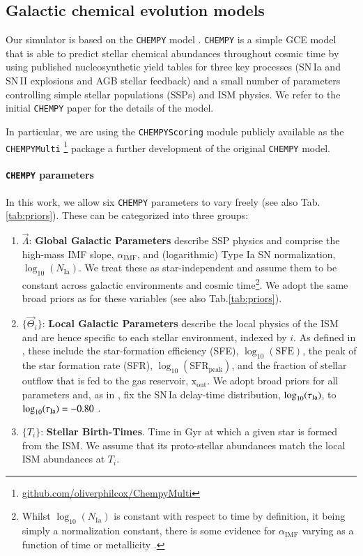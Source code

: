 \documentclass{aa}
\begin{document}
\subsection{Galactic chemical evolution models}
Our simulator is based on the \texttt{CHEMPY} model \citep{Rybizki_2017}. \texttt{CHEMPY} is a simple GCE model that is able to predict stellar chemical abundances throughout cosmic time by using published nucleosynthetic yield tables for three key processes (SN\,Ia and SN\,II explosions and AGB stellar feedback) and a small number of parameters controlling simple stellar populations (SSPs) and ISM physics. We refer to the initial \texttt{CHEMPY} paper \citep{Rybizki_2017} for the details of the model.

In particular, we are using the \texttt{CHEMPYScoring} module \citep{Philcox_2018} publicly available as the \texttt{CHEMPYMulti} \citep{Philcox_2019}\footnote{\href{https://github.com/oliverphilcox/ChempyMulti}{github.com/oliverphilcox/ChempyMulti}} package a further development of the original \texttt{CHEMPY} model. 

\paragraph{\texttt{CHEMPY} parameters}
In this work, we allow six \texttt{CHEMPY} parameters to vary freely (see also Tab.\,\ref{tab:priors}). These can be categorized into three groups:
\begin{enumerate}
     \item $\vec\Lambda$: \textbf{Global Galactic Parameters} describe SSP physics and comprise the high-mass \citet{2003PASP..115..763C} IMF slope, $\alpha_\mathrm{IMF}$, and (logarithmic) Type Ia SN normalization, $\log_{10}(N_\mathrm{Ia})$. We treat these as star-independent and assume them to be constant across galactic environments and cosmic time\footnote{Whilst $\log_{10}(N_\mathrm{Ia})$ is constant with respect to time by definition, it being simply a normalization constant, there is some evidence for $\alpha_\mathrm{IMF}$ varying as a function of time or metallicity \citep{Chabrier2014,2016MNRAS.462.2832C,2019MNRAS.482..118G,Martin2019}.}. 
     We adopt the same broad priors as \citep{Philcox_2019} for these variables (see also Tab.\ref{tab:priors}). 
     \item $\{\vec\Theta_i\}$: \textbf{Local Galactic Parameters} describe the local physics of the ISM and are hence specific to each stellar environment, indexed by $i$. As defined in \citep{Rybizki_2017}, these include the star-formation efficiency (SFE), $\log_{10}(\text{SFE})$, the peak of the star formation rate (SFR), $\log_{10}(\mathrm{SFR}_\mathrm{peak})$, and the fraction of stellar outflow that is fed to the gas reservoir, $\mathrm{x}_\mathrm{out}$. We adopt broad priors for all parameters and, as in \citep{Philcox_2019}, fix the SN\,Ia delay-time distribution, $\log_{10}(\tau_{\rm Ia})$, to $\log_{10}(\tau_{\rm Ia})=-0.80$ \citep[see also][]{Philcox_2018}.
     \item $\{T_i\}$: \textbf{Stellar Birth-Times}. Time in Gyr at which a given star is formed from the ISM. We assume that its proto-stellar abundances match the local ISM abundances at $T_i$.
\end{enumerate}
\end{document}
